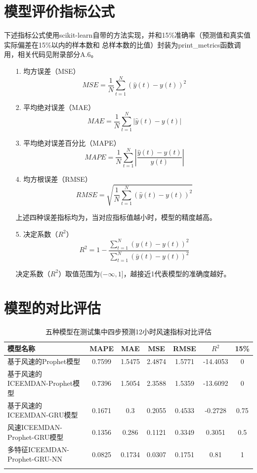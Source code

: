 \documentclass[AutoFakeBold]{LZUThesis}
\begin{document}
\section{模型评价指标公式}
下述指标公式使用scikit-learn自带的方法实现，并和15\%准确率（预测值和真实值实际偏差在15\%以内的样本数和
总样本数的比值）封装为print\_metrics函数调用，相关代码见附录部分A.6。
\begin{itemize}
\item[1. ] 均方误差（MSE）
$$MSE=\frac{1}{N}\sum_{t=1}^{N}\left(\hat{y}\left(t\right)-y\left(t\right)\right)^2$$

\item[2. ] 平均绝对误差（MAE）
$$MAE=\frac{1}{N}\sum_{t=1}^{N}\left|\hat{y}\left(t\right)-y\left(t\right)\right|$$

\item[3. ] 平均绝对误差百分比（MAPE）
$$MAPE=\frac{1}{N}\sum_{t=1}^{N}\left|\frac{\hat{y}\left(t\right)-y\left(t\right)}{y\left(t\right)}\right|$$

\item[4. ] 均方根误差（RMSE）
$$RMSE=\sqrt{\frac{1}{N}\sum_{t=1}^{N}\left(\hat{y}\left(t\right)-y\left(t\right)\right)^2}$$

上述四种误差指标均为，当对应指标值越小时，模型的精度越高。

\item[5. ] 决定系数（$R^2$）
$$R^2=1-\frac{\sum_{t=1}^{N}(\hat{y}\left(t\right)-y\left(t\right))^2}{\sum_{t=1}^{N}(\bar{y}\left(t\right)-y\left(t\right))^2}$$

决定系数（$R^2$）取值范围为$(-\infty, 1]$，越接近1代表模型的准确度越好。
\end{itemize}

\section{模型的对比评估}

\begin{table}[H]
    \centering
    \caption{五种模型在测试集中四步预测12小时风速指标对比评估}
    \begin{tabular}{lcccccc}
    \toprule
    模型名称 & MAPE & MAE & MSE & RMSE & $R^2$ & 15\% \\
    \midrule
    基于风速的Prophet模型 & 0.7599 & 1.5475 & 2.4874 & 1.5771 & -14.4053 & 0 \\
    基于风速的ICEEMDAN-Prophet模型 & 0.7396 & 1.5054 & 2.3588 & 1.5359 & -13.6092 & 0 \\
    基于风速的ICEEMDAN-GRU模型 & 0.1671 & 0.3 & 0.2055 & 0.4533 & -0.2728 & 0.75 \\
    风速ICEEMDAN-Prophet-GRU模型 & 0.1356 & 0.286 & 0.1121 & 0.3349 & 0.3051 & 0.5 \\
    多特征ICEEMDAN-Prophet-GRU-NN & 0.0825 & 0.1734 & 0.0307 & 0.1751 & 0.81 & 1 \\
    \bottomrule \\
    \end{tabular} \\
    \label{models-metrics}
\end{table}
\end{document}
